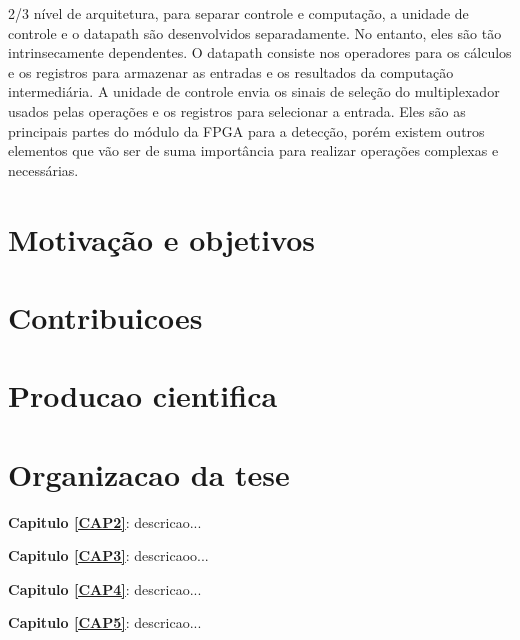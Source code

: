 2/3
nível de arquitetura, para separar controle e computação, a unidade de controle e o datapath são desenvolvidos separadamente. No entanto, eles são tão intrinsecamente dependentes. O datapath consiste nos operadores para os cálculos e os registros para armazenar as entradas e os resultados da computação intermediária. A unidade de controle envia os sinais de seleção do multiplexador usados pelas operações e os registros para selecionar a entrada. Eles são as principais partes do módulo da FPGA para a detecção, porém existem outros elementos que vão ser de suma importância para realizar operações complexas e necessárias.
\section{Motivação e objetivos}


 
\section{Contribuicoes}




\section{Producao cientifica}


\section{Organizacao da tese}

\noindent \textbf{Capitulo \ref{CAP2}}: descricao...

\noindent \textbf{Capitulo \ref{CAP3}}: descricaoo...

\noindent \textbf{Capitulo \ref{CAP4}}: descricao...

\noindent \textbf{Capitulo \ref{CAP5}}: descricao...
